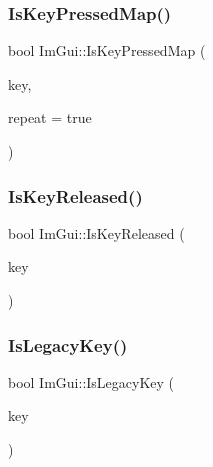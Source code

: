 \mbox{\label{namespaceImGui_aa4c4806c81aef3abe125b209f19d4a2b}} 
\subsubsection{\texorpdfstring{Is\+Key\+Pressed\+Map()}{IsKeyPressedMap()}}
{\footnotesize\ttfamily bool Im\+Gui\+::\+Is\+Key\+Pressed\+Map (\begin{DoxyParamCaption}\item[{\hyperlink{imgui_8h_aa22ffe36b188427d712447ec465203d4}{Im\+Gui\+Key}}]{key,  }\item[{bool}]{repeat = {\ttfamily true} }\end{DoxyParamCaption})\hspace{0.3cm}{\ttfamily [inline]}}

\mbox{\label{namespaceImGui_af37007f6f7296f056590b1ca54796f56}} 
\subsubsection{\texorpdfstring{Is\+Key\+Released()}{IsKeyReleased()}}
{\footnotesize\ttfamily bool Im\+Gui\+::\+Is\+Key\+Released (\begin{DoxyParamCaption}\item[{\hyperlink{imgui_8h_aa22ffe36b188427d712447ec465203d4}{Im\+Gui\+Key}}]{key }\end{DoxyParamCaption})}

\mbox{\label{namespaceImGui_a8737377cd9666008318a3fa66fa943c7}} 
\subsubsection{\texorpdfstring{Is\+Legacy\+Key()}{IsLegacyKey()}}
{\footnotesize\ttfamily bool Im\+Gui\+::\+Is\+Legacy\+Key (\begin{DoxyParamCaption}\item[{\hyperlink{imgui_8h_aa22ffe36b188427d712447ec465203d4}{Im\+Gui\+Key}}]{key }\end{DoxyParamCaption})\hspace{0.3cm}{\ttfamily [inline]}}

